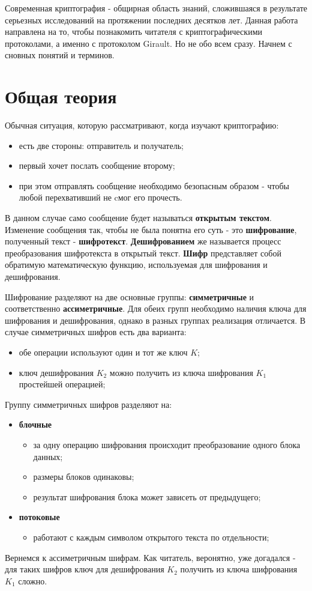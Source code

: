 \documentclass[a4paper]{article}
\begin{document}
 Современная криптография - общирная область знаний, сложившаяся в результате серьезных исследований на протяжении последних десятков лет. 
 Данная работа направлена на то,
  чтобы познакомить читателя с криптографическими протоколами, а именно с протоколом Girault. Но не обо всем сразу. Начнем с сновных понятий и терминов.

\section{Общая теория}

Обычная ситуация, которую рассматривают, когда изучают криптографию:
\begin{itemize}
    \item есть две стороны: отправитель и получатель;
    \item первый хочет послать сообщение второму;
    \item при этом отправлять сообщение необходимо безопасным образом -  чтобы любой перехвативший не cмог его прочесть.
\end{itemize}
\par В данном случае само сообщение будет называться \textbf{открытым текстом}. Изменение сообщения так, чтобы не была понятна его суть - это \textbf{шифрование}, полученный текст - \textbf{шифротекст}.
\textbf{Дешифрованием} же называется процесс преобразования шифротекста в открытый текст. \textbf{Шифр} представляет собой обратимую математическую функцию, используемая для шифрования и дешифрования.
 
\par Шифрование разделяют на две основные группы: \textbf{симметричные} и соответственно \textbf{ассиметричные}. Для обеих групп необходимо наличия ключа для шифрования и дешифрования, однако в разных группах реализация отличается. В случае симметричных шифров есть два варианта: 
\begin{itemize}
    \item обе операции используют один и тот же ключ $K$;
    \item ключ дешифрования $K_2$ можно получить из ключа шифрования $K_1$ простейшей операцией;
\end{itemize}
Группу симметричных шифров разделяют на:
\begin{itemize}
    \item \textbf{блочные} 
    \begin{itemize}
        \item за одну операцию шифрования происходит преобразование одного блока данных;
        \item размеры блоков одинаковы;
        \item результат шифрования блока может зависеть от предыдущего;
    \end{itemize}
    \item \textbf{потоковые} 
    \begin{itemize}
        \item работают с каждым символом открытого текста по отдельности;
        \end{itemize}
\end{itemize}
Вернемся к ассиметричным шифрам. Как читатель, веронятно, уже догадался  - для таких шифров ключ для дешифрования $K_2$ получить из ключа шифрования $K_1$ сложно. 
\end{document}
